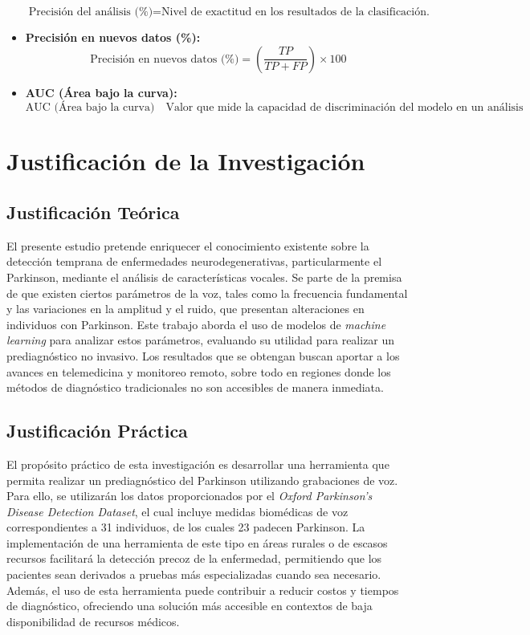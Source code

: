 \documentclass[listof=nochaptergap,12pt,times,authoryear]{report}
\begin{document}
\begin{itemize}
\begin{equation}
        \text{Precisión del análisis (\%)} = \text{Nivel de exactitud en los resultados de la clasificación.} \tag{9}
    \end{equation}
    \item \textbf{Precisión en nuevos datos (\%):} 
    \begin{equation}
        \text{Precisión en nuevos datos (\%)} = \left(\frac{TP}{TP + FP}\right) \times 100 \tag{10}
    \end{equation}
    \item \textbf{AUC (Área bajo la curva):} 
    \begin{equation}
        \text{AUC (Área bajo la curva)} \quad \text{Valor que mide la capacidad de discriminación del modelo en un análisis ROC.} \tag{11}
    \end{equation}
\end{itemize}




\section{Justificación de la Investigación}
\subsection{Justificación Teórica}
El presente estudio pretende enriquecer el conocimiento existente sobre la detección temprana de enfermedades neurodegenerativas, particularmente el Parkinson, mediante el análisis de características vocales. Se parte de la premisa de que existen ciertos parámetros de la voz, tales como la frecuencia fundamental y las variaciones en la amplitud y el ruido, que presentan alteraciones en individuos con Parkinson. Este trabajo aborda el uso de modelos de \textit{machine learning} para analizar estos parámetros, evaluando su utilidad para realizar un prediagnóstico no invasivo. Los resultados que se obtengan buscan aportar a los avances en telemedicina y monitoreo remoto, sobre todo en regiones donde los métodos de diagnóstico tradicionales no son accesibles de manera inmediata.

\subsection{Justificación Práctica}
El propósito práctico de esta investigación es desarrollar una herramienta que permita realizar un prediagnóstico del Parkinson utilizando grabaciones de voz. Para ello, se utilizarán los datos proporcionados por el \textit{Oxford Parkinson's Disease Detection Dataset}, el cual incluye medidas biomédicas de voz correspondientes a 31 individuos, de los cuales 23 padecen Parkinson. La implementación de una herramienta de este tipo en áreas rurales o de escasos recursos facilitará la detección precoz de la enfermedad, permitiendo que los pacientes sean derivados a pruebas más especializadas cuando sea necesario. Además, el uso de esta herramienta puede contribuir a reducir costos y tiempos de diagnóstico, ofreciendo una solución más accesible en contextos de baja disponibilidad de recursos médicos.
\end{document}
